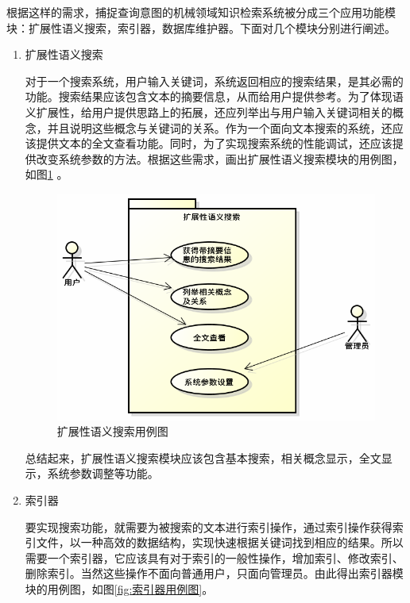 \documentclass[12pt,a4paper]{article}
\begin{document}
	根据这样的需求，捕捉查询意图的机械领域知识检索系统被分成三个应用功能模块：扩展性语义搜索，索引器，数据库维护器。下面对几个模块分别进行阐述。
	\begin{enumerate}
	\item 扩展性语义搜索
	
	对于一个搜索系统，用户输入关键词，系统返回相应的搜索结果，是其必需的功能。搜索结果应该包含文本的摘要信息，从而给用户提供参考。为了体现语义扩展性，给用户提供思路上的拓展，还应列举出与用户输入关键词相关的概念，并且说明这些概念与关键词的关系。作为一个面向文本搜索的系统，还应该提供文本的全文查看功能。同时，为了实现搜索系统的性能调试，还应该提供改变系统参数的方法。根据这些需求，画出扩展性语义搜索模块的用例图，如图\ref{fig:扩展性语义搜索用例图} 。
	
	\begin{figure}[htbp] 
	\centering\includegraphics[scale=0.4]{fig/SearchSystemUseCase.png} 
	\caption{扩展性语义搜索用例图}\label{fig:扩展性语义搜索用例图} 
	\end{figure} 

	总结起来，扩展性语义搜索模块应该包含基本搜索，相关概念显示，全文显示，系统参数调整等功能。
	
	\item 索引器
	
	要实现搜索功能，就需要为被搜索的文本进行索引操作，通过索引操作获得索引文件，以一种高效的数据结构，实现快速根据关键词找到相应的结果。所以需要一个索引器，它应该具有对于索引的一般性操作，增加索引、修改索引、删除索引。当然这些操作不面向普通用户，只面向管理员。由此得出索引器模块的用例图，如图\ref{fig:索引器用例图}。
	

\end{enumerate}
\end{document}
